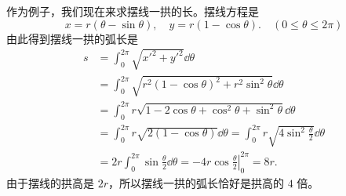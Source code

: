 作为例子，我们现在来求摆线一拱的长。摆线方程是
\[
  x = r(\theta - \sin\theta),\quad y = r(1 - \cos\theta).\quad (0 \leqslant \theta \leqslant 2\pi)
\]
由此得到摆线一拱的弧长是
\begin{align*}
  s &= \int_{0}^{2\pi} \sqrt{x'^2 + y'^2}\dd\theta \\
    &= \int_{0}^{2\pi} \sqrt{r^2(1 - \cos\theta)^2 + r^2\sin^2\theta}\dd\theta \\
    &= \int_{0}^{2\pi} r\sqrt{1 - 2\cos\theta + \cos^2\theta + \sin^2\theta}\dd\theta \\
    &= \int_{0}^{2\pi} r\sqrt{2(1 - \cos\theta)}\dd\theta
     = \int_{0}^{2\pi} r\sqrt{4\sin^2\frac{\theta}{2}}\dd\theta \\
    &= 2r\int_{0}^{2\pi} \sin\frac{\theta}{2}\dd\theta
     = \left.-4r\cos\frac{\theta}{2}\right|_{0}^{2\pi} = 8r.
\end{align*}
由于摆线的拱高是 $2r$，所以摆线一拱的弧长恰好是拱高的 $4$ 倍。
